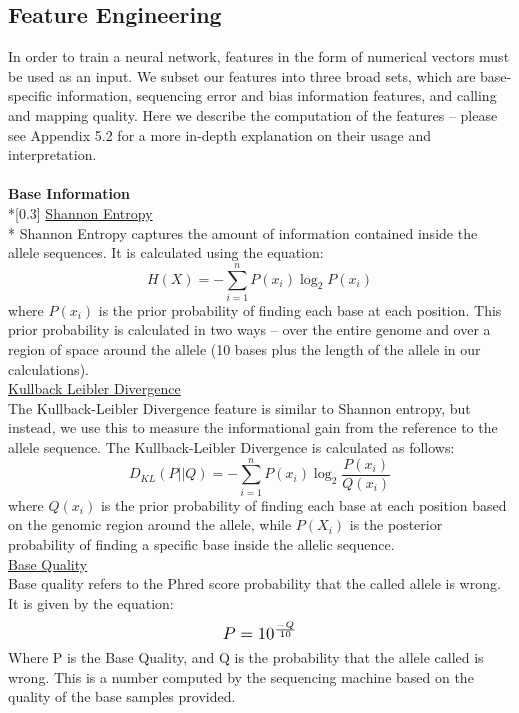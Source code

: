 \documentclass{article}
\begin{document}
\subsection{Feature Engineering}
In order to train a neural network, features in the form of numerical vectors must be used as an input. We subset our features into three broad sets, which are base-specific information, sequencing error and bias information features, and calling and mapping quality. Here we describe the computation of the features -- please see Appendix 5.2 for a more in-depth explanation on their usage and interpretation.\\\\
\textbf{Base Information} \\*[0.3\baselineskip]
\underline{Shannon Entropy}\\*
Shannon Entropy captures the amount of information contained inside the allele sequences. It is calculated using the equation:
\begin{equation}
H(X) = -\sum_{i=1}^{n}P(x_i)\log_{2}P(x_i)
\end{equation}
where $P(x_i)$ is the prior probability of finding each base at each position. This prior probability is calculated in two ways -- over the entire genome and over a region of space around the allele (10 bases plus the length of the allele in our calculations).\\[0.3\baselineskip]
\underline{Kullback Leibler Divergence}\\
The Kullback-Leibler Divergence feature is similar to Shannon entropy, but instead, we use this to measure the informational gain from the reference to the allele sequence. The Kullback-Leibler Divergence is calculated as follows:
\begin{equation}
D_{KL}(P||Q) = -\sum_{i=1}^{n}P(x_i)\log_{2}{\frac{P(x_i)}{Q(x_i)}}
\end{equation}
where $Q(x_i)$ is the prior probability of finding each base at each position based on the genomic region around the allele, while $P(X_i)$ is the posterior probability of finding a specific base inside the allelic sequence.\\[0.3\baselineskip]
\underline{Base Quality}\\
Base quality refers to the Phred score probability that the called allele is wrong. It is given by the equation:
\[ \scalebox{1.2}{$P=10^{\frac{-Q}{10}}$} \]
Where P is the Base Quality, and Q is the probability that the allele called is wrong. This is a number computed by the sequencing machine based on the quality of the base samples provided.\\\\
\end{document}
